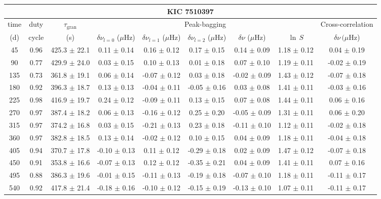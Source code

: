 \documentclass[twocolumn]{aastex61}%
\begin{document}
\begin{table*}[ht]\centering\fontsize{9.}{7.}\selectfont
\begin{tabular}{ccc|ccccc|c}
\multicolumn{9}{c}{KIC 7510397}\\ \hline\hline
time & duty & $\tau_\text{gran}$ &\multicolumn{5}{c|}{Peak-bagging}&Cross-correlation\\
(d)& cycle & (s)&$\delta\nu_{l=0}$ ($\mu$Hz) & $\delta\nu_{l=1}$ ($\mu$Hz) & $\delta\nu_{l=2}$ ($\mu$Hz) & $\delta\nu$ ($\mu$Hz)& $\ln\,S$ & $\delta\nu\,(\mu$Hz)\\\hline
45 & 0.96 & 425.3 $\pm$ 22.1 & 0.11 $\pm$ 0.14 & 0.16 $\pm$ 0.12 & 0.17 $\pm$ 0.15 & 0.14 $\pm$ 0.09 & 1.18 $\pm$ 0.12 & 0.04 $\pm$ 0.19\\
90 & 0.77 & 429.9 $\pm$ 24.0 & 0.03 $\pm$ 0.15 & 0.10 $\pm$ 0.13 & 0.01 $\pm$ 0.18 & 0.07 $\pm$ 0.10 & 1.19 $\pm$ 0.11 & -0.02 $\pm$ 0.19\\
135 & 0.73 & 361.8 $\pm$ 19.1 & 0.06 $\pm$ 0.14 & -0.07 $\pm$ 0.12 & 0.03 $\pm$ 0.18 & -0.02 $\pm$ 0.09 & 1.43 $\pm$ 0.12 & -0.07 $\pm$ 0.18\\
180 & 0.92 & 396.3 $\pm$ 18.7 & 0.13 $\pm$ 0.13 & -0.04 $\pm$ 0.11 & -0.05 $\pm$ 0.16 & 0.03 $\pm$ 0.08 & 1.41 $\pm$ 0.11 & -0.03 $\pm$ 0.16\\
225 & 0.98 & 416.9 $\pm$ 19.7 & 0.24 $\pm$ 0.12 & -0.09 $\pm$ 0.11 & 0.13 $\pm$ 0.15 & 0.07 $\pm$ 0.08 & 1.44 $\pm$ 0.11 & 0.06 $\pm$ 0.16\\
270 & 0.97 & 387.4 $\pm$ 18.2 & 0.06 $\pm$ 0.13 & -0.16 $\pm$ 0.12 & 0.25 $\pm$ 0.20 & -0.05 $\pm$ 0.09 & 1.31 $\pm$ 0.11 & 0.06 $\pm$ 0.20\\
315 & 0.97 & 374.2 $\pm$ 16.8 & 0.03 $\pm$ 0.15 & -0.21 $\pm$ 0.13 & 0.23 $\pm$ 0.18 & -0.11 $\pm$ 0.10 & 1.12 $\pm$ 0.11 & -0.02 $\pm$ 0.18\\
360 & 0.97 & 382.8 $\pm$ 18.5 & 0.13 $\pm$ 0.14 & -0.02 $\pm$ 0.12 & 0.10 $\pm$ 0.15 & 0.04 $\pm$ 0.09 & 1.18 $\pm$ 0.11 & -0.04 $\pm$ 0.18\\
405 & 0.94 & 370.7 $\pm$ 17.8 & -0.10 $\pm$ 0.13 & 0.11 $\pm$ 0.12 & -0.29 $\pm$ 0.18 & 0.02 $\pm$ 0.09 & 1.47 $\pm$ 0.12 & -0.07 $\pm$ 0.18\\
450 & 0.91 & 353.8 $\pm$ 16.6 & -0.07 $\pm$ 0.13 & 0.12 $\pm$ 0.12 & -0.35 $\pm$ 0.21 & 0.04 $\pm$ 0.09 & 1.41 $\pm$ 0.11 & 0.07 $\pm$ 0.16\\
495 & 0.88 & 386.3 $\pm$ 19.6 & -0.01 $\pm$ 0.15 & -0.11 $\pm$ 0.13 & -0.19 $\pm$ 0.18 & -0.07 $\pm$ 0.10 & 1.18 $\pm$ 0.11 & -0.11 $\pm$ 0.17\\
540 & 0.92 & 417.8 $\pm$ 21.4 & -0.18 $\pm$ 0.16 & -0.10 $\pm$ 0.12 & -0.15 $\pm$ 0.19 & -0.13 $\pm$ 0.10 & 1.07 $\pm$ 0.11 & -0.11 $\pm$ 0.17\\

\end{tabular}
\end{table*}
\end{document}

